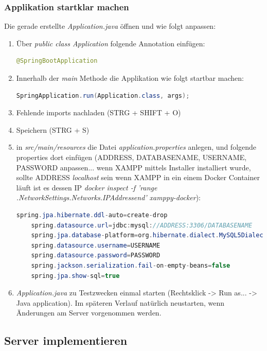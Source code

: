 \documentclass[11pt]{scrartcl}
\begin{document}
\newpage
\subsubsection{Applikation startklar machen}
\label{customizeapplication}
Die gerade erstellte \textit{Application.java} öffnen und wie folgt anpassen:
\begin{enumerate}
    \item Über \textit{public class Application} folgende Annotation einfügen:
    \begin{lstlisting}[language=java]
    @SpringBootApplication
    \end{lstlisting}
    \item Innerhalb der \textit{main} Methode die Applikation wie folgt startbar machen:
    \begin{lstlisting}[language=java]
    SpringApplication.run(Application.class, args);
    \end{lstlisting}
    \item Fehlende imports nachladen (STRG + SHIFT + O)
    \item Speichern (STRG + S)
    \item in \textit{src/main/resources} die Datei \textit{application.properties}
          anlegen, und folgende properties dort einfügen
          (ADDRESS, DATABASENAME, USERNAME, PASSWORD anpassen... 
          wenn XAMPP mittels Installer installiert wurde, sollte ADDRESS \textit{localhost} sein
          wenn XAMPP in ein einem Docker Container läuft ist es dessen IP \textit{docker inspect -f '{{range .NetworkSettings.Networks}}{{.IPAddress}}{{end}}' xamppy-docker}):
    \begin{lstlisting}[language=java]
    spring.jpa.hibernate.ddl-auto=create-drop
    spring.datasource.url=jdbc:mysql://ADDRESS:3306/DATABASENAME
    spring.jpa.database-platform=org.hibernate.dialect.MySQL5Dialect
    spring.datasource.username=USERNAME
    spring.datasource.password=PASSWORD
    spring.jackson.serialization.fail-on-empty-beans=false
    spring.jpa.show-sql=true
    \end{lstlisting}
    \item \textit{Application.java} zu Testzwecken einmal starten
          (Rechtsklick -> Run as... -> Java application). Im späteren Verlauf natürlich neustarten,
          wenn Änderungen am Server vorgenommen werden.
\end{enumerate}

\newpage
\subsection{Server implementieren}
\label{sec:implementserver}
\end{document}
